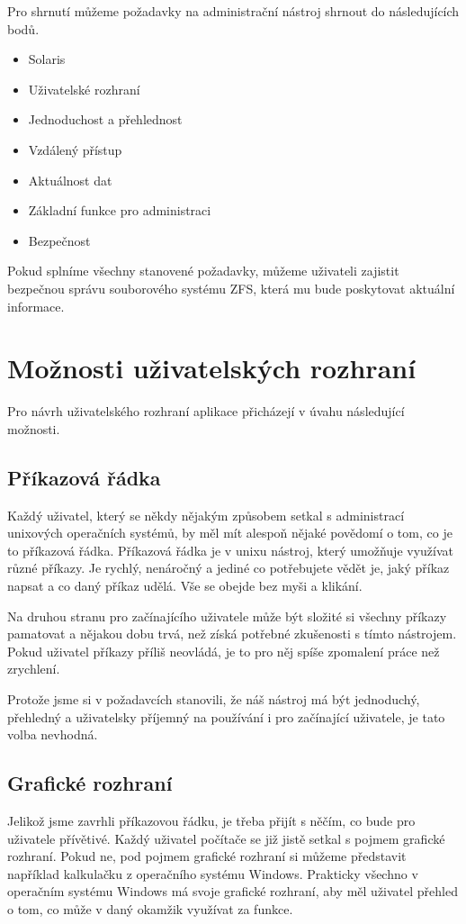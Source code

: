 Pro shrnutí můžeme požadavky na administrační nástroj shrnout do následujících bodů.
\begin{itemize}
    \item Solaris
    \item Uživatelské rozhraní
    \item Jednoduchost a přehlednost
    \item Vzdálený přístup
    \item Aktuálnost dat
    \item Základní funkce pro administraci
    \item Bezpečnost
\end{itemize}

Pokud splníme všechny stanovené požadavky, můžeme uživateli zajistit bezpečnou správu souborového systému ZFS, která mu bude poskytovat aktuální informace.
\section{Možnosti uživatelských rozhraní}
Pro návrh uživatelského rozhraní aplikace přicházejí v úvahu následující možnosti.
    \subsection{Příkazová řádka}
    Každý uživatel, který se někdy nějakým způsobem setkal s administrací unixových operačních systémů, by měl mít alespoň nějaké povědomí o tom, co je to příkazová řádka. Příkazová řádka je v unixu nástroj, který umožňuje využívat různé příkazy. Je rychlý, nenáročný a jediné co potřebujete vědět je, jaký příkaz napsat a co daný příkaz udělá. Vše se obejde bez myši a klikání.

    Na druhou stranu pro začínajícího uživatele může být složité si všechny příkazy pamatovat a nějakou dobu trvá, než získá potřebné zkušenosti s tímto nástrojem. Pokud uživatel příkazy příliš neovládá, je to pro něj spíše zpomalení práce než zrychlení.

    Protože jsme si v požadavcích stanovili, že náš nástroj má být jednoduchý, přehledný a uživatelsky příjemný na používání i pro začínající uživatele, je tato volba nevhodná.
    \subsection{Grafické rozhraní}
    Jelikož jsme zavrhli příkazovou řádku, je třeba přijít s něčím, co bude pro uživatele přívětivé. Každý uživatel počítače se již jistě setkal s pojmem grafické rozhraní. Pokud ne, pod pojmem grafické rozhraní si můžeme představit například kalkulačku z operačního systému Windows. Prakticky všechno v operačním systému Windows má svoje grafické rozhraní, aby měl uživatel přehled o tom, co může v daný okamžik využívat za funkce.

